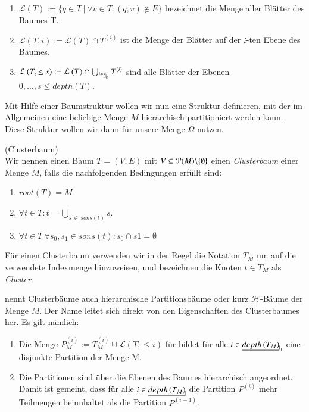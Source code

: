 \begin{defn}
\begin{enumerate}
	  \item $\mathcal{L}\left(T\right) := \{q \in T \ | \ \forall v \in T \colon \left(q,v\right) \notin E \}$ bezeichnet die Menge aller Blätter des Baumes T.
	  \item $\mathcal{L}\left(T,i\right) := \mathcal{L}\left(T\right) \cap T^{\left(i\right)}$ ist die Menge der Blätter auf der $i$-ten Ebene des Baumes.
	  \item $\mathcal{L}\left(T,\leq s\right) := \mathcal{L}\left(T\right) \cap \bigcup_{i \in \nullhaken{s}} T^{\left(i\right)}$ sind alle Blätter der Ebenen $0, \dots ,s \leq depth\left(T\right)$.
	\end{enumerate}
	\nopagebreak[4]
	\citep{h2diss}
      \end{defn}
      
      Mit Hilfe einer Baumstruktur wollen wir nun eine Struktur definieren, mit der im Allgemeinen eine beliebige Menge $M$ hierarchisch partitioniert werden kann. Diese Struktur wollen
      wir dann für unsere Menge $\Omega$ nutzen.
      
      \begin{defn}
      \label{def:clusterbaum}
	(Clusterbaum)\\
	Wir nennen einen Baum $T = \left(V,E\right)$ mit $V \subseteq \mathcal{P}(M) \backslash \{ \emptyset \}$ einen \textit{Clusterbaum} einer Menge $M$, falls die nachfolgenden 
	Bedingungen erfüllt sind:
	\begin{enumerate}
	  \item $root\left(T\right) = M$
	  \item $\forall t \in T : t = {\bigcup}_{s \, \in \, sons\left(t\right)} s.$
	  \item $\forall t \in T \ \forall s_0, s_1 \in sons\left(t\right) : s_0 \cap s1 = \emptyset$
	\end{enumerate}
	Für einen Clusterbaum verwenden wir in der Regel die Notation $T_M$ um auf die verwendete Indexmenge hinzuweisen, und bezeichnen die Knoten $t \in T_M$ als \textit{Cluster}.
	\citep{nichtlokop}
      \end{defn}
      
      \citet{h2diss} nennt Clusterbäume auch hierarchische Partitionsbäume oder kurz $\mathcal{H}$-Bäume der Menge $M$. Der Name leitet sich direkt von den Eigenschaften
      des Clusterbaumes her. Es gilt nämlich:
      \begin{enumerate}
      \item Die Menge $P_M^{\left(i\right)} := T_M^{\left(i\right)} \cup \mathcal{L}\left(T, \leq i\right)$ für bildet für alle $i \in \nullhaken{depth\left(T_M\right)}$ eine disjunkte Partition der Menge M.
      \item Die Partitionen sind über die Ebenen des Baumes hierarchisch angeordnet. Damit ist gemeint, dass für alle $i \in \haken{depth\left(T_M\right)}$ die Partition $P^{\left(i\right)}$ mehr Teilmengen beinnhaltet
	    als die Partition $P^{\left(i-1\right)}$.
      \end{enumerate}

